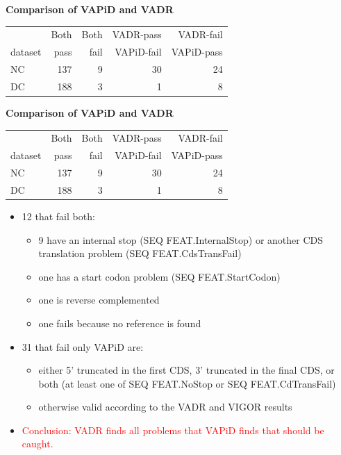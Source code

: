 \documentclass[landscape]{slides}
\begin{document}
\begin{slide}
\begin{center}
\textbf{Comparison of VAPiD and VADR}

\begin{tabular}{|l|r|r|r|r|}
\hline
          & Both       & Both       & VADR-pass  & VADR-fail  \\
 dataset  & pass       & fail       & VAPiD-fail & VAPiD-pass \\ \hline
       NC &        137 &          9 &         30 &     24 \\ 
       DC &        188 &          3 &          1 &      8 \\ 
\hline 
\end{tabular}

\end{center}

\vfill
\end{slide}
\begin{slide}
\begin{center}
\textbf{Comparison of VAPiD and VADR}

\begin{tabular}{|l|r|r|r|r|}
\hline
          & Both       & Both       & VADR-pass  & VADR-fail  \\
 dataset  & pass       & fail       & VAPiD-fail & VAPiD-pass \\ \hline
       NC &        137 &          9 &         30 &     24 \\ 
       DC &        188 &          3 &          1 &      8 \\ 
\hline 
\end{tabular}

\small
\begin{itemize}
\item 12 that fail both:
  \begin{itemize}
  \item 9 have an internal stop (SEQ FEAT.InternalStop) or another
    CDS translation problem (SEQ FEAT.CdsTransFail)
  \item one has a start codon problem (SEQ FEAT.StartCodon)
  \item one is reverse complemented
  \item one fails because no reference is found
  \end{itemize}
\item 31 that fail only VAPiD are:
  \begin{itemize}
  \item either 5’ truncated in the first CDS, 3’ truncated in the
    final CDS, or both (at least one of SEQ FEAT.NoStop or SEQ FEAT.CdTransFail)
  \item 
    otherwise valid according to the VADR and VIGOR results
  \end{itemize}
\item \textcolor{red}{Conclusion: VADR finds all problems that VAPiD finds that should
  be caught.}
\end{itemize}
\end{center}

\vfill
\end{slide}
\end{document}
